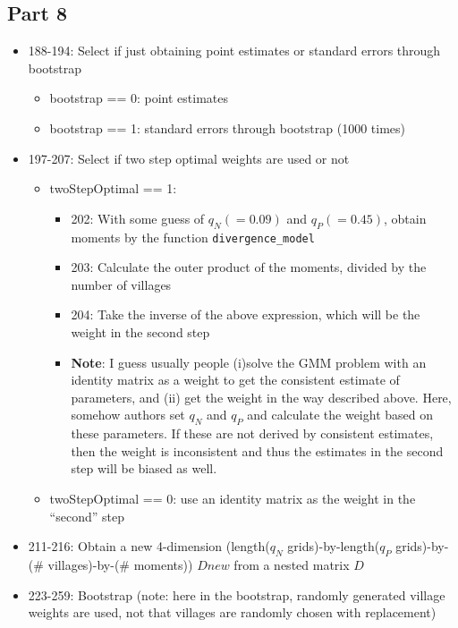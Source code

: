 \documentclass[10pt,letterpaper]{article}
\begin{document}
\subsection*{Part 8}
\begin{itemize}
  \item 188-194: Select if just obtaining point estimates or standard errors through bootstrap
    \begin{itemize}
      \item bootstrap == 0: point estimates
      \item bootstrap == 1: standard errors through bootstrap (1000 times)
    \end{itemize}
  \item 197-207: Select if two step optimal weights are used or not
    \begin{itemize}
      \item twoStepOptimal == 1: 
        \begin{itemize}
          \item 202: With some guess of $q_N (= 0.09)$ and $q_P (= 0.45)$, obtain moments by the function \texttt{divergence\_model}
          \item 203: Calculate the outer product of the moments, divided by the number of villages
          \item 204: Take the inverse of the above expression, which will be the weight in the second step
          \item \textbf{Note}: I guess usually people 
            (i)solve the GMM problem with an identity matrix as a weight to get the consistent estimate of parameters, and 
            (ii) get the weight in the way described above.
            Here, somehow authors set $q_N$ and $q_P$ and calculate the weight based on these parameters.
            If these are not derived by consistent estimates, then the weight is inconsistent and thus the estimates in the second step will be biased as well.
        \end{itemize}
      \item twoStepOptimal == 0: use an identity matrix as the weight in the ``second'' step
    \end{itemize}
  \item 211-216: Obtain a new 4-dimension (length($q_N$ grids)-by-length($q_P$ grids)-by-(\# villages)-by-(\# moments))   $Dnew$ from a nested matrix $D$
  \item 223-259: Bootstrap (note: here in the bootstrap, randomly generated village weights are used, not that villages are randomly chosen with replacement)

\end{itemize}
\end{document}
